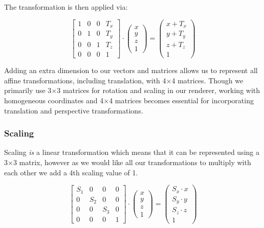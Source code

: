 \documentclass[12pt]{article}
\begin{document}
The transformation is then applied via:

\[
    \begin{bmatrix}  1 & 0 & 0 & {T_x} \\ 0 & 1 & 0 & {T_y} \\ 0 & 0 & 1 & {T_z} \\ 0 & 0 & 0 & 1 \end{bmatrix} \cdot \begin{pmatrix} x \\ y \\ z \\ 1 \end{pmatrix} = \begin{pmatrix} x + {T_x} \\ y + {T_y} \\ z + {T_z} \\ 1 \end{pmatrix}
\]

Adding an extra dimension to our vectors and matrices allows us to represent all affine transformations, including translation, with 4$\times$4 matrices. Though we primarily use 3$\times$3 matrices for rotation and scaling in our renderer, working with homogeneous coordinates and 4$\times$4 matrices becomes essential for incorporating translation and perspective transformations.


\subsubsection{Scaling}

Scaling \textit{is} a linear transformation which means that it can be represented using a 3$\times$3 matrix, however as we would like all our transformations to multiply with each other we add a 4th scaling value of 1.

\[
    \begin{bmatrix}
        {S_1} & 0     & 0     & 0 \\
        0     & {S_2} & 0     & 0 \\
        0     & 0     & {S_3} & 0 \\
        0     & 0     & 0     & 1
    \end{bmatrix} \cdot
    \begin{pmatrix} x \\ y \\ z \\ 1 \end{pmatrix} =
    \begin{pmatrix} {S_x} \cdot x \\ {S_y} \cdot y \\ {S_z} \cdot z \\ 1 \end{pmatrix}
\]
\end{document}
